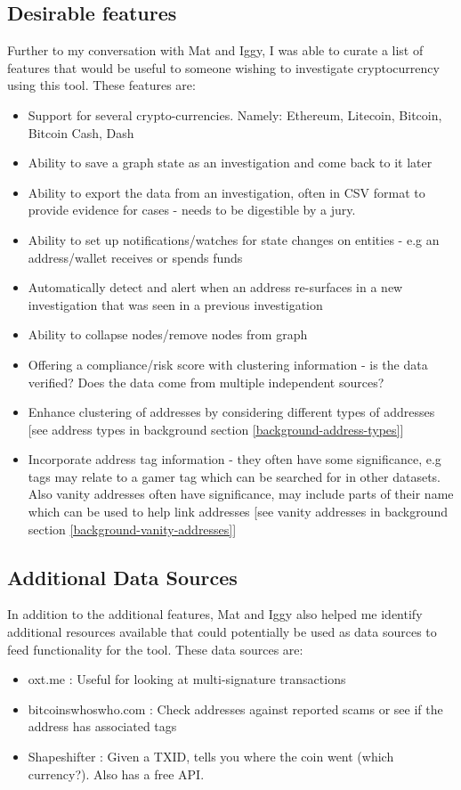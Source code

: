 \subsection{Desirable features}
Further to my conversation with Mat and Iggy, I was able to curate a list of features that would be useful to someone wishing to investigate cryptocurrency using this tool. These features are:
\begin{itemize}
    \item Support for several crypto-currencies. Namely: Ethereum, Litecoin, Bitcoin, Bitcoin Cash, Dash
    \item Ability to save a graph state as an investigation and come back to it later
    \item Ability to export the data from an investigation, often in CSV format to provide evidence for cases - needs to be digestible by a jury.
    \item Ability to set up notifications/watches for state changes on entities - e.g an address/wallet receives or spends funds 
    \item Automatically detect and alert when an address re-surfaces in a new investigation that was seen in a previous investigation 
    \item Ability to collapse nodes/remove nodes from graph 
    \item Offering a compliance/risk score with clustering information - is the data verified? Does the data come from multiple independent sources? 
    \item Enhance clustering of addresses by considering different types of addresses [see address types in background section \ref{background-address-types}]
    \item Incorporate address tag information - they often have some significance, e.g tags may relate to a gamer tag which can be searched for in other datasets. Also vanity addresses often have significance, may include parts of their name which can be used to help link addresses [see vanity addresses in background section \ref{background-vanity-addresses}]
\end{itemize}

\subsection{Additional Data Sources}
In addition to the additional features, Mat and Iggy also helped me identify additional resources available that could potentially be used as data sources to feed functionality for the tool. These data sources are:
\begin{itemize}
    \item oxt.me : Useful for looking at multi-signature transactions
    \item bitcoinswhoswho.com : Check addresses against reported scams or see if the address has associated tags
    \item Shapeshifter : Given a TXID, tells you where the coin went (which currency?). Also has a free API.
\end{itemize}

